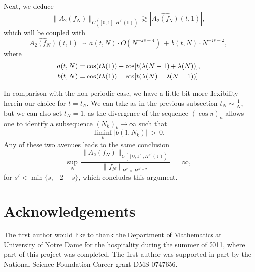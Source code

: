\documentclass{amsart}
\begin{document}
Next, we deduce
\[
\|A_2(f_N)\|_{C([0,1], H^{s'}(\mathbb{T}))} \gtrsim \left|\widehat{A_2(f_N)}(t,1)\right|,
\]
which will be coupled with
\[
\widehat{A_2(f_N)}(t,1)\,\sim\,a(t,N)\cdot O(N^{-2s-4})\,+\,b(t,N)\cdot N^{-2s-2},
\]
where
\[\aligned
a(t,N)&= \cos (t\lambda(1))-\cos[t(\lambda(N-1) + \lambda(N))],\\ b(t,N)&= \cos (t\lambda(1))-\cos[t(\lambda(N) - \lambda(N-1))].
\endaligned
\]

In comparison with the non-periodic case, we have a little bit more flexibility herein our choice for $t=t_N$. We can take as in the previous subsection $t_N \sim \frac{1}{N}$, but we can also set $t_N=1$, as the divergence of the sequence $(\cos n)_n$ allows one to identify a subsequence $(N_k)_k\to\infty$ such that 
\[
\liminf_k \left|b(1, N_k)\right|\,>\,0.
\]
Any of these two avenues leads to the same conclusion:
\[
\sup_N\,\frac{\|A_2(f_N)\|_{C([0,1], H^{s'}(\mathbb{T}))}}{\|f_N\|_{H^{s'}\times H^{s'-2}}}\,=\,\infty,\]
for $s'<\min\{s,-2-s\}$, which concludes this argument.

\section*{Acknowledgements}
The first author would like to thank the Department of Mathematics at University of Notre Dame for the hospitality during the summer of 2011, where part of this project was completed. The first author was supported in part by the National Science Foundation Career grant DMS-0747656.



\end{document}
